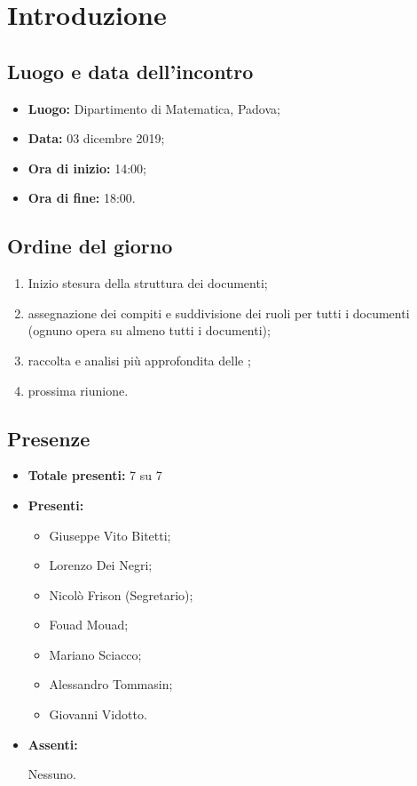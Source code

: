 \section*{Introduzione}

\subsection*{Luogo e data dell'incontro}
	\begin{itemize}
		\item \textbf{Luogo:} Dipartimento di Matematica, Padova;

		\item \textbf{Data:} 03 dicembre 2019;

		\item \textbf{Ora di inizio:} 14:00;
		\item \textbf{Ora di fine:} 18:00.
	\end{itemize}

\subsection*{Ordine del giorno}
	\begin{enumerate}
		\item Inizio stesura della struttura dei documenti;
		\item assegnazione dei compiti e suddivisione dei ruoli per tutti i documenti (ognuno opera su almeno tutti i documenti);
		\item raccolta e analisi più approfondita delle {\dext};
		\item prossima riunione.

	\end{enumerate}

\subsection*{Presenze}
	\begin{itemize}
		\item \textbf{Totale presenti:} 7 su 7
		\item \textbf{Presenti: }

			\begin{itemize}			
				\item Giuseppe Vito Bitetti;
				\item Lorenzo Dei Negri;
				\item Nicolò Frison (Segretario);
				\item Fouad Mouad;
				\item Mariano Sciacco;
				\item Alessandro Tommasin;
				\item Giovanni Vidotto.
			\end{itemize}
		\item \textbf{Assenti: } 
    \begin{itemize}		
			Nessuno.
	\end{itemize}
      
	\end{itemize}


